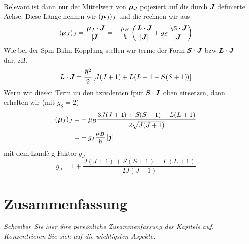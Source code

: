 Relevant ist dann nur der Mittelwert von  $\boldsymbol{\mu}_J $ pojeziert auf die durch $\boldsymbol{J}$ definierte Achse. Diese Länge nennen wir $(\boldsymbol{\mu}_J)_J$ und die rechnen wir aus
\begin{equation}
    (\bmu_J)_J = \frac{\bmu_J \cdot \bJ}{|\bJ|}
    = - \frac{\mu_B}{\hbar} \left(
        \frac{\bL \cdot \bJ}{|\bJ|}
        +  g_S \,\frac{\S \cdot \bJ}{|\bJ|}
    \right)
\end{equation}
Wie bei der Spin-Bahn-Kopplung stellen wir terme der Form $\boldsymbol{S} \cdot \boldsymbol{J}$ bzw $\boldsymbol{L} \cdot \boldsymbol{J}$  dar, zB.
\begin{equation}
    \boldsymbol{L} \cdot \boldsymbol{J} = \frac{\hbar^2}{2}
    \left[
  J (J+1) + L(L+1 - S(S+1))
    \right]
\end{equation}
Wenn wir diesen Term un den äzivalenten fpür  $\boldsymbol{S} \cdot \boldsymbol{J}$  oben einsetzen, dann erhalten wir (mit $g_S = 2$)
\begin{align}
    (\boldsymbol{\mu}_J)_J = & - \mu_B \frac{3 J (J+1)+ S(S+1) - L(L+1)}{2 \sqrt{J (J+1)}} \\
    = & - g_J \frac{\mu_B}{\hbar} \, |\boldsymbol{j}|
\end{align}
mit dem Landé-g-Faktor $g_J$ 
\begin{equation}
    g_J = 1 + \frac{J (J+1)+ S(S+1) - L(L+1)}{2 J (J+1)} 
\end{equation}

\section{Zusammenfassung}


\textit{Schreiben Sie hier ihre persönliche Zusammenfassung des Kapitels auf. Konzentrieren Sie sich auf die wichtigsten Aspekte.}

\vspace*{10cm}

\printbibliography[segment=\therefsegment,heading=subbibliography]
